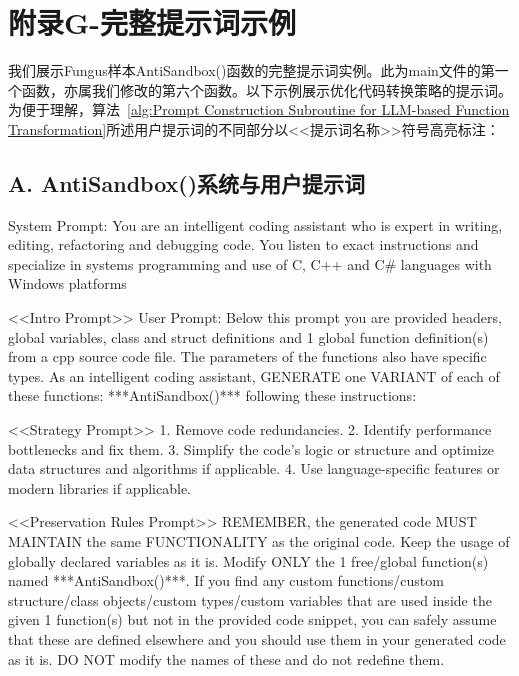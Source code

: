 \chapter{附录G-完整提示词示例}

我们展示Fungus样本AntiSandbox()函数的完整提示词实例。此为main文件的第一个函数，亦属我们修改的第六个函数。以下示例展示优化代码转换策略的提示词。为便于理解，算法~\ref{alg:Prompt Construction Subroutine for LLM-based Function Transformation}所述用户提示词的不同部分以<<提示词名称>>符号高亮标注：

\section{A. AntiSandbox()系统与用户提示词}
System Prompt: You are an intelligent coding assistant who is expert in writing, editing, refactoring and debugging code. You listen to exact instructions and specialize in systems programming and use of C, C++ and C\# languages with Windows platforms

<<Intro Prompt>>
User Prompt: Below this prompt you are provided headers, global variables, class and struct definitions and 1 global function definition(s) from a cpp source code file. The parameters of the functions also have specific types. As an intelligent coding assistant, GENERATE one VARIANT of each of these functions: ***AntiSandbox()*** following these instructions: 

<<Strategy Prompt>>
1. Remove code redundancies.
2. Identify performance bottlenecks and fix them.
3. Simplify the code’s logic or structure and optimize
data structures and algorithms if applicable.
4. Use language-specific features or modern libraries if
applicable.

<<Preservation Rules Prompt>>
REMEMBER, the generated code MUST MAINTAIN the same FUNCTIONALITY as the original code. Keep the usage of globally declared variables as it is. Modify ONLY the 1 free/global function(s) named ***AntiSandbox()***. If you find any custom functions/custom structure/class objects/custom types/custom variables that are used inside the given 1 function(s) but not in the provided code snippet, you can safely assume that these are defined elsewhere and you should use them in your generated code as it is. DO NOT modify the names of these and do not redefine them.

